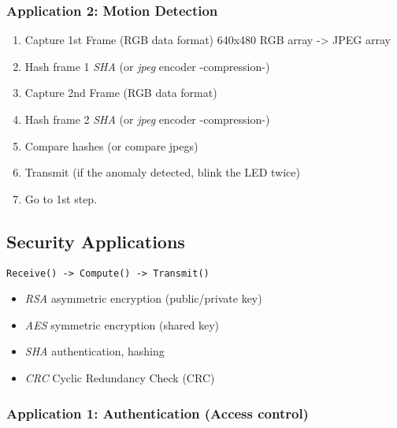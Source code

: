 \documentclass[]{article}
\providecommand{\tightlist}{%
  \setlength{\itemsep}{0pt}\setlength{\parskip}{0pt}}
\begin{document}
\hypertarget{application-2-motion-detection}{%
\subsubsection*{Application 2: Motion Detection}\label{application-2-motion-detection}}

\begin{enumerate}
\def\labelenumi{\arabic{enumi}.}
\tightlist
\item
  Capture 1st Frame (RGB data format) 640x480 RGB array -\textgreater{} JPEG array
\item
  Hash frame 1 \emph{SHA} (or \emph{jpeg} encoder -compression-)
\item
  Capture 2nd Frame (RGB data format)
\item
  Hash frame 2 \emph{SHA} (or \emph{jpeg} encoder -compression-)
\item
  Compare hashes (or compare jpegs)
\item
  Transmit (if the anomaly detected, blink the LED twice)
\item
  Go to 1st step.
\end{enumerate}

\hypertarget{security-applications}{%
\subsection{Security Applications}\label{security-applications}}

\texttt{Receive()\ -\textgreater{}\ Compute()\ -\textgreater{}\ Transmit()}

\begin{itemize}
\tightlist
\item
  \emph{RSA} asymmetric encryption (public/private key)
\item
  \emph{AES} symmetric encryption (shared key)
\item
  \emph{SHA} authentication, hashing
\item
  \emph{CRC} Cyclic Redundancy Check (CRC)
\end{itemize}

\hypertarget{application-1-authentication-access-control}{%
\subsubsection*{Application 1: Authentication (Access control)}\label{application-1-authentication-access-control}}
\end{document}
